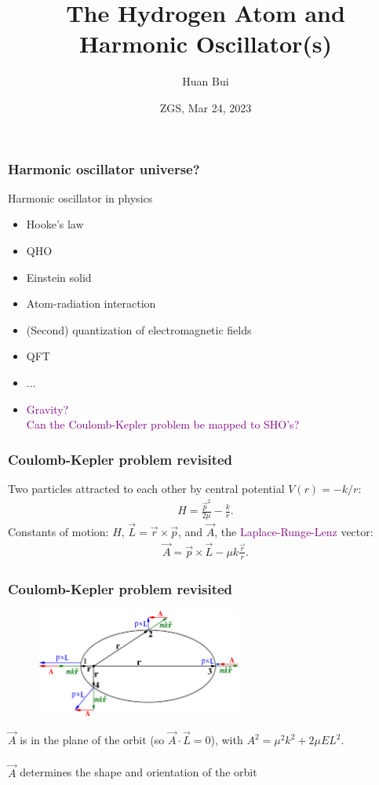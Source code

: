 \documentclass{beamer}
\title[\textcolor{white}{{}}]
{
The Hydrogen Atom and Harmonic Oscillator(s)
}
\author[Bui] %
{Huan Bui}
\institute[MIT]{MIT} %
\date{ZGS, Mar 24, 2023}
\theoremstyle{definition}
\newcommand{\f}[2]{\frac{#1}{#2}}
\begin{document}
 
\frame{\titlepage}

\begin{frame}
	\frametitle{Harmonic oscillator universe?}
	
	Harmonic oscillator in physics
	\begin{itemize}
		\item Hooke's law
		\item QHO
		\item Einstein solid
		\item Atom-radiation interaction
		\item (Second) quantization of electromagnetic fields 
		\item QFT
		\item $\dots$
		\item \textcolor{purple}{Gravity? \\ 
		Can the Coulomb-Kepler problem be mapped to SHO's?}
	\end{itemize}

\end{frame}


\begin{frame}
	\frametitle{Coulomb-Kepler problem revisited}
	Two particles attracted to each other by central potential $V(r) = -k/r$:
	\begin{align*}
	H = \f{\vec{p}^2}{2\mu} - \f{k}{r}.
	\end{align*}
	Constants of motion: $H$, $\vec{L} = \vec{r}\times \vec{p}$, and $\vec{A}$, the \textcolor{purple}{Laplace-Runge-Lenz} vector:
	\begin{align*}
	\vec{A} = \vec{p}\times \vec{L} - \mu k \f{ \vec{r}}{r}.
	\end{align*}	
	
	\end{frame}



\begin{frame}
\frametitle{Coulomb-Kepler problem revisited}
\begin{figure}
\centering
\includegraphics[width=0.6\textwidth]{figures/LRL.eps}
\end{figure}

$\vec{A}$ is in the plane of the orbit (so $\vec{A}\cdot \vec{L} = 0$), with ${A}^2 = \mu^2 k^2 + 2\mu E {L}^2$. \\
\,\,\, \\ 
$\vec{A}$ determines the shape and orientation of the orbit


\end{frame}
\end{document}
